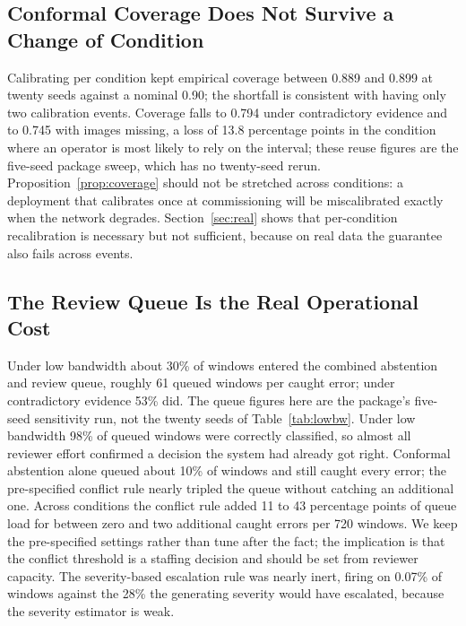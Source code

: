 \documentclass[conference,a4paper]{IEEEtran}
\begin{document}
\subsection{Conformal Coverage Does Not Survive a Change of Condition}
\label{sec:coverage}
Calibrating per condition kept empirical coverage between 0.889 and 0.899 at twenty seeds against a nominal 0.90; the shortfall is consistent with having only two calibration events. Coverage falls to 0.794 under contradictory evidence and to 0.745 with images missing, a loss of 13.8 percentage points in the condition where an operator is most likely to rely on the interval; these reuse figures are the five-seed package sweep, which has no twenty-seed rerun. Proposition~\ref{prop:coverage} should not be stretched across conditions: a deployment that calibrates once at commissioning will be miscalibrated exactly when the network degrades. Section~\ref{sec:real} shows that per-condition recalibration is necessary but not sufficient, because on real data the guarantee also fails across events.

\subsection{The Review Queue Is the Real Operational Cost}
\label{sec:queue}
Under low bandwidth about 30\% of windows entered the combined abstention and review queue, roughly 61 queued windows per caught error; under contradictory evidence 53\% did. The queue figures here are the package's five-seed sensitivity run, not the twenty seeds of Table~\ref{tab:lowbw}. Under low bandwidth 98\% of queued windows were correctly classified, so almost all reviewer effort confirmed a decision the system had already got right. Conformal abstention alone queued about 10\% of windows and still caught every error; the pre-specified conflict rule nearly tripled the queue without catching an additional one. Across conditions the conflict rule added 11 to 43 percentage points of queue load for between zero and two additional caught errors per 720 windows. We keep the pre-specified settings rather than tune after the fact; the implication is that the conflict threshold is a staffing decision and should be set from reviewer capacity. The severity-based escalation rule was nearly inert, firing on 0.07\% of windows against the 28\% the generating severity would have escalated, because the severity estimator is weak.
\end{document}
